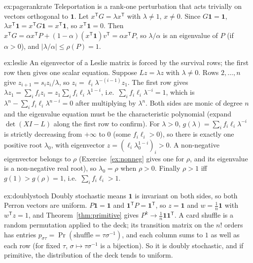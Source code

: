 \begin{solution}{ex:pagerankrate}
\idea Teleportation is a rank-one perturbation that acts trivially on vectors orthogonal to $\mathbf 1$.
\writeup Let $x^{\mathsf T}G=\lambda x^{\mathsf T}$ with $\lambda\ne1$, $x\ne0$. Since $G\mathbf 1=\mathbf 1$, $\lambda x^{\mathsf
T}\mathbf 1=x^{\mathsf T}G\mathbf 1=x^{\mathsf T}\mathbf 1$, so $x^{\mathsf T}\mathbf 1=0$. Then $x^{\mathsf T}G=\alpha x^{\mathsf T}P+
(1-\alpha)(x^{\mathsf T}\mathbf 1)v^{\mathsf T}=\alpha x^{\mathsf T}P$, so $\lambda/\alpha$ is an eigenvalue of $P$ (if $\alpha>0$),
and $|\lambda/\alpha|\le\rho(P)=1$.
\end{solution}

\begin{solution}{ex:leslie}
\idea An eigenvector of a Leslie matrix is forced by the survival rows; the first row then gives one scalar equation.
\writeup Suppose $Lz=\lambda z$ with $\lambda\ne0$. Rows $2,\dots,n$ give $z_{i+1}=s_iz_i/\lambda$, so $z_i=\ell_i\lambda^{-(i-1)}z_1$.
The first row gives $\lambda z_1=\sum_if_iz_i=z_1\sum_if_i\ell_i\lambda^{1-i}$, i.e.\ $\sum_if_i\ell_i\lambda^{-i}=1$, which is
$\lambda^n-\sum_if_i\ell_i\lambda^{n-i}=0$ after multiplying by $\lambda^n$. Both sides are monic of degree $n$ and the
eigenvalue equation must be the characteristic polynomial (expand $\det(XI-L)$ along the first row to confirm). For $\lambda>0$,
$g(\lambda)=\sum_if_i\ell_i\lambda^{-i}$ is strictly decreasing from $+\infty$ to $0$ (some $f_i\ell_i>0$), so there is
exactly one positive root $\lambda_0$, with eigenvector $z=(\ell_i\lambda_0^{1-i})_i>0$. A non-negative eigenvector belongs to
$\rho$ (Exercise~\ref{ex:nonneg} gives one for $\rho$, and its eigenvalue is a non-negative real root), so $\lambda_0=\rho$ when
$\rho>0$. Finally $\rho>1$ iff $g(1)>g(\rho)=1$, i.e.\ $\sum_if_i\ell_i>1$.
\end{solution}

\begin{solution}{ex:doublystoch}
\idea Doubly stochastic means $\mathbf 1$ is invariant on both sides, so both Perron vectors are uniform.
\writeup $P\mathbf 1=\mathbf 1$ and $\mathbf 1^{\mathsf T}P=\mathbf 1^{\mathsf T}$, so $z=\mathbf 1$ and $w=\frac1n\mathbf 1$ with
$w^{\mathsf T}z=1$, and Theorem~\ref{thm:primitive} gives $P^k\to\frac1n\mathbf 1\mathbf 1^{\mathsf T}$. A card shuffle is a
random permutation applied to the deck; its transition matrix on the $n!$ orders has entries $p_{\sigma\tau}=\Pr(\text{shuffle}=
\tau\sigma^{-1})$, and each column sums to $1$ as well as each row (for fixed $\tau$, $\sigma\mapsto\tau\sigma^{-1}$ is a
bijection). So it is doubly stochastic, and if primitive, the distribution of the deck tends to uniform.
\end{solution}

